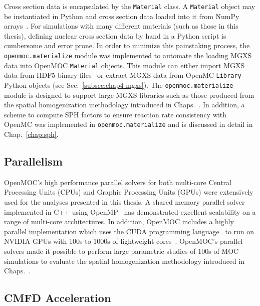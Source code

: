 Cross section data is encapsulated by the \texttt{Material} class. A \texttt{Material} object may be instantiated in Python and cross section data loaded into it from NumPy arrays~\cite{walt2011numpy}. For simulations with many different materials (such as those in this thesis), defining nuclear cross section data by hand in a Python script is cumbersome and error prone. In order to minimize this painstaking process, the \texttt{openmoc.materialize} module was implemented to automate the loading \ac{MGXS} data into OpenMOC \texttt{Material} objects. This module can either import \ac{MGXS} data from HDF5 binary files~\cite{koranne2011hdf5} or extract \ac{MGXS} data from OpenMC \texttt{Library} Python objects (see Sec.~\ref{subsec:chap4-mgxs}). The \texttt{openmoc.materialize} module is designed to support large \ac{MGXS} libraries such as those produced from the spatial homogenization methodology introduced in Chaps.~. In addition, a scheme to compute \ac{SPH} factors to ensure reaction rate consistency with OpenMC was implemented in \texttt{openmoc.materialize} and is discussed in detail in Chap.~\ref{chap:sph}.

\subsection{Parallelism}
\label{subsubsec:chap4-openmoc-parallel}

OpenMOC's high performance parallel solvers for both multi-core Central Processing Units (CPUs) and Graphic Processing Units (GPUs) were extensively used for the analyses presented in this thesis. A shared memory parallel solver implemented in C++ using OpenMP~\cite{openmp2013} has demonstrated excellent scalability on a range of multi-core architectures\cite{boyd2016parallel}. In addition, OpenMOC includes a highly parallel implementation which uses the CUDA programming language~\cite{nvidia2012cuda} to run on NVIDIA GPUs with 100s to 1000s of lightweight cores~\cite{boyd2013massively}. OpenMOC's parallel solvers made it possible to perform large parametric studies of 100s of \ac{MOC} simulations to evaluate the spatial homogenization methodology introduced in Chaps.~.


\subsection{CMFD Acceleration}
\label{subsubsec:chap4-openmoc-cmfd}

